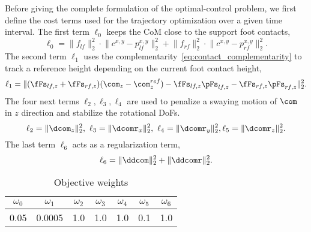 Before giving the complete formulation of the optimal-control problem, we first define the cost terms used for the trajectory optimization over a given time interval.
The first term $\ell_0$ keeps the CoM close to the support foot contacts,
$$    \ell_0 = \lVert f_{lf} \rVert_2^2 \cdot \lVert c^{x,y} - p_{lf}^{x,y}  \rVert_2^2
             + \lVert f_{rf} \rVert_2^2 \cdot \lVert c^{x,y} - p_{rf}^{x,y}  \rVert_2^2
             .
    \label{eq:optimal_control_objective_0}
$$
The second term $\ell_1$ uses the complementarity~\eqref{eq:contact_complementarity} to track a reference height depending on the current foot contact height,
$$
    \ell_1 = \lVert (\fFs_{lf,z} + \fFs_{rf,z})(\com_z - \com_z^{ref}) - \fFs_{lf,z} \pFs_{lf,z} - \fFs_{rf,z} \pFs_{rf,z} \rVert_2^2
    .
    \label{eq:optimal_control_objective_1}
$$
The four next terms $\ell_2, \ell_3, \ell_4$ are used to penalize a swaying motion of $\com$ in $z$ direction and stabilize the rotational DoFs.
$$    \ell_2 = \lVert \dcom_z \rVert_2^2
    \label{eq:optimal_control_objective_2}
,\    \ell_3 = \lVert \dcomr_x \rVert_2^2
    \label{eq:optimal_control_objective_3}
,\    \ell_4 = \lVert \dcomr_y \rVert_2^2
    \label{eq:optimal_control_objective_4}
,
  \ell_5 = \lVert \dcomr_z \rVert_2^2
.
    \label{eq:optimal_control_objective_5}
$$
The last term $\ell_6$
acts as a regularization term,
$$    \ell_6 = \lVert \ddcom \rVert_2^2 + \lVert \ddcomr \rVert_2^2
.
    \label{eq:optimal_control_objective_6}
$$
%


\begin{table}[ht]
  \vspace*{0.3cm}
  \caption{Objective weights}
  \centering
  \begin{tabular}{|ccccccc|}
    \hline
    $\omega_0$ & $\omega_1$ & $\omega_2$ &
    $\omega_3$ & $\omega_4$ & $\omega_5$ & $\omega_6$ \\
    \hline
    0.05 & 0.0005 & 1.0 & 1.0 & 1.0 & 0.1 & 1.0 \\ \hline
  \end{tabular}
  \label{tab:objective_weights}
\end{table}
